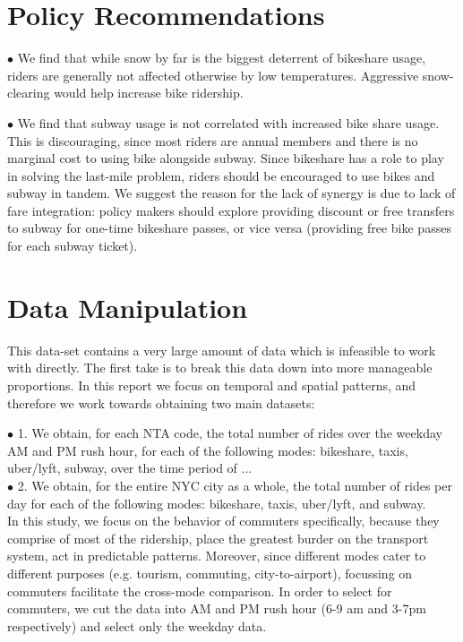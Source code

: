 \documentclass[12pt]{article}
\begin{document}
\section*{Policy Recommendations}
$\bullet$ We find that while snow by far is the biggest deterrent of bikeshare usage, riders are generally not affected otherwise by low temperatures. Aggressive snow-clearing would help increase bike ridership.

$\bullet$ We find that subway usage is not correlated with increased bike share usage. This is discouraging, since most riders are annual members and there is no marginal cost to using bike alongside subway. Since bikeshare has a role to play in solving the last-mile problem, riders should be encouraged to use bikes and subway in tandem. We suggest the reason for the lack of synergy is due to lack of fare integration: policy makers should explore providing discount or free transfers to subway for one-time bikeshare passes, or vice versa (providing free bike passes for each subway ticket).



\newpage 

\section*{Data Manipulation}
This data-set contains a very large amount of data which is infeasible to work with directly. The first take is to break this data down into more manageable proportions. In this report we focus on temporal and spatial patterns, and therefore we work towards obtaining two main datasets:

$\bullet$ 1. We obtain, for each NTA code, the total number of rides over the weekday AM and PM rush hour, for each of the following modes: bikeshare, taxis, uber/lyft, subway, over the time period of ... \\ 
$\bullet$ 2. We obtain, for the entire NYC city as a whole, the total number of rides per day for each of the following modes: bikeshare, taxis, uber/lyft, and subway. \\

In this study, we focus on the behavior of commuters specifically, because they comprise of most of the ridership, place the greatest burder on the transport system, act in predictable patterns. Moreover, since different modes cater to different purposes (e.g. tourism, commuting, city-to-airport), focussing on commuters facilitate the cross-mode comparison. In order to select for commuters, we cut the data into AM and PM rush hour (6-9 am and 3-7pm respectively) and select only the weekday data. 
\end{document}
